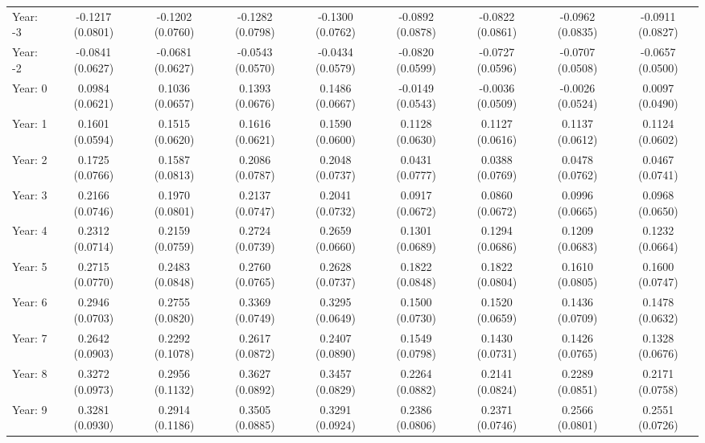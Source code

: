 \begin{tabular}{lcccccccc}
   Year: -3                            & -0.1217 (0.0801) & -0.1202 (0.0760) & -0.1282 (0.0798) & -0.1300 (0.0762) & -0.0892 (0.0878) & -0.0822 (0.0861) & -0.0962 (0.0835) & -0.0911 (0.0827)\\   
   Year: -2                            & -0.0841 (0.0627) & -0.0681 (0.0627) & -0.0543 (0.0570) & -0.0434 (0.0579) & -0.0820 (0.0599) & -0.0727 (0.0596) & -0.0707 (0.0508) & -0.0657 (0.0500)\\   
   Year: 0                             & 0.0984 (0.0621)  & 0.1036 (0.0657)  & 0.1393 (0.0676)  & 0.1486 (0.0667)  & -0.0149 (0.0543) & -0.0036 (0.0509) & -0.0026 (0.0524) & 0.0097 (0.0490)\\   
   Year: 1                             & 0.1601 (0.0594)  & 0.1515 (0.0620)  & 0.1616 (0.0621)  & 0.1590 (0.0600)  & 0.1128 (0.0630)  & 0.1127 (0.0616)  & 0.1137 (0.0612)  & 0.1124 (0.0602)\\   
   Year: 2                             & 0.1725 (0.0766)  & 0.1587 (0.0813)  & 0.2086 (0.0787)  & 0.2048 (0.0737)  & 0.0431 (0.0777)  & 0.0388 (0.0769)  & 0.0478 (0.0762)  & 0.0467 (0.0741)\\   
   Year: 3                             & 0.2166 (0.0746)  & 0.1970 (0.0801)  & 0.2137 (0.0747)  & 0.2041 (0.0732)  & 0.0917 (0.0672)  & 0.0860 (0.0672)  & 0.0996 (0.0665)  & 0.0968 (0.0650)\\   
   Year: 4                             & 0.2312 (0.0714)  & 0.2159 (0.0759)  & 0.2724 (0.0739)  & 0.2659 (0.0660)  & 0.1301 (0.0689)  & 0.1294 (0.0686)  & 0.1209 (0.0683)  & 0.1232 (0.0664)\\   
   Year: 5                             & 0.2715 (0.0770)  & 0.2483 (0.0848)  & 0.2760 (0.0765)  & 0.2628 (0.0737)  & 0.1822 (0.0848)  & 0.1822 (0.0804)  & 0.1610 (0.0805)  & 0.1600 (0.0747)\\   
   Year: 6                             & 0.2946 (0.0703)  & 0.2755 (0.0820)  & 0.3369 (0.0749)  & 0.3295 (0.0649)  & 0.1500 (0.0730)  & 0.1520 (0.0659)  & 0.1436 (0.0709)  & 0.1478 (0.0632)\\   
   Year: 7                             & 0.2642 (0.0903)  & 0.2292 (0.1078)  & 0.2617 (0.0872)  & 0.2407 (0.0890)  & 0.1549 (0.0798)  & 0.1430 (0.0731)  & 0.1426 (0.0765)  & 0.1328 (0.0676)\\   
   Year: 8                             & 0.3272 (0.0973)  & 0.2956 (0.1132)  & 0.3627 (0.0892)  & 0.3457 (0.0829)  & 0.2264 (0.0882)  & 0.2141 (0.0824)  & 0.2289 (0.0851)  & 0.2171 (0.0758)\\   
   Year: 9                             & 0.3281 (0.0930)  & 0.2914 (0.1186)  & 0.3505 (0.0885)  & 0.3291 (0.0924)  & 0.2386 (0.0806)  & 0.2371 (0.0746)  & 0.2566 (0.0801)  & 0.2551 (0.0726)\\   

\end{tabular}
